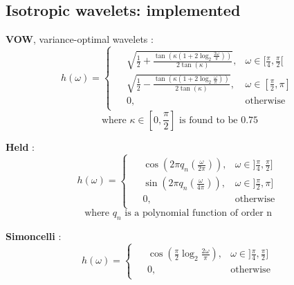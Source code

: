 \documentclass{InsightArticle}
\theoremstyle{definition}
\begin{document}
\subsection{Isotropic wavelets: implemented}
\noindent\begin{minipage}[t]{0.49\textwidth}
  \textbf{VOW}, variance-optimal wavelets \cite{pad_vow:_2014} :
\begin{equation*}
\label{VOW}
  h(\omega) =
    \begin{cases}
    \begin{aligned}
      &\sqrt{\frac{1}{2} + \frac{\tan(\kappa(1+2\log_2\frac{2\omega}{\pi}))}{2\tan(\kappa)}} , &\omega \in [\frac{\pi}{4} , \frac{\pi}{2} [ \\
      &\sqrt{\frac{1}{2} - \frac{\tan(\kappa(1+2\log_2\frac{\omega}{\pi}))}{2\tan(\kappa)}} , &\omega \in [\frac{\pi}{2} , \pi ] \\
      &0, &\text{otherwise}
    \end{aligned}
    \end{cases}
\end{equation*}
\begin{equation*}
  \text{where } \kappa \in [0, \frac{\pi}{2}] \text{ is found to be } 0.75
\end{equation*}
\newline
\end{minipage}
\noindent\begin{minipage}[t]{0.49\textwidth}
  \textbf{Held} \cite{held_steerable_2010} :
\begin{equation*}
\label{Held}
  h(\omega) =
    \begin{cases}
    \begin{aligned}
&\cos\left(2\pi q_n(\frac{\omega}{2\pi})\right) , &\omega \in ]\frac{\pi}{4} , \frac{\pi}{2} ] \\
  &\sin\left(2\pi q_n(\frac{\omega}{4\pi})\right) , &\omega \in ]\frac{\pi}{2} , \pi ] \\
      &0, &\text{otherwise}
    \end{aligned}
    \end{cases}
\end{equation*}
\begin{equation*}
  \text{where } q_n \text{ is a polynomial function of order n } %
\end{equation*}
\end{minipage}
\noindent\begin{minipage}[t]{0.49\textwidth}
  \textbf{Simoncelli} \cite{portilla_image_2000, simoncelli_steerable_1995} :
\begin{equation*}
\label{Simoncelli}
  h(\omega) =
    \begin{cases}
    \begin{aligned}
  &\cos\left(\frac{\pi}{2} \log_2\frac{2\omega}{\pi}\right) , &\omega \in ]\frac{\pi}{4} , \frac{\pi}{2} ] \\
  &0, &\text{otherwise}
    \end{aligned}
    \end{cases}
\end{equation*}
\end{minipage}
\end{document}
